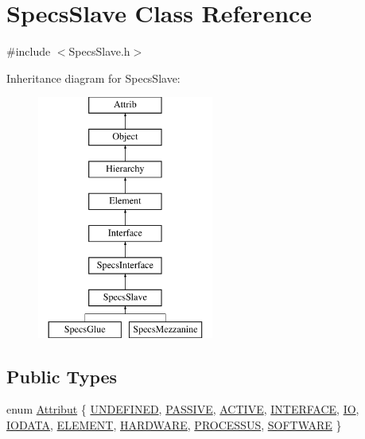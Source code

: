 \hypertarget{classSpecsSlave}{}\section{Specs\+Slave Class Reference}
\label{classSpecsSlave}


{\ttfamily \#include $<$Specs\+Slave.\+h$>$}

Inheritance diagram for Specs\+Slave\+:\begin{figure}[H]
\begin{center}
\leavevmode
\includegraphics[height=8.000000cm]{classSpecsSlave}
\end{center}
\end{figure}
\subsection*{Public Types}
\begin{DoxyCompactItemize}
\item 
enum \hyperlink{classAttrib_a69e171d7cc6417835a5a306d3c764235}{Attribut} \{ \newline
\hyperlink{classAttrib_a69e171d7cc6417835a5a306d3c764235a3a8da2ab97dda18aebab196fe4100531}{U\+N\+D\+E\+F\+I\+N\+ED}, 
\hyperlink{classAttrib_a69e171d7cc6417835a5a306d3c764235a2bfb2af57b87031d190a05fe25dd92ed}{P\+A\+S\+S\+I\+VE}, 
\hyperlink{classAttrib_a69e171d7cc6417835a5a306d3c764235a3b1fec929c0370d1436f2f06e298fb0d}{A\+C\+T\+I\+VE}, 
\hyperlink{classAttrib_a69e171d7cc6417835a5a306d3c764235aa27c16b480a369ea4d18b07b2516bbc7}{I\+N\+T\+E\+R\+F\+A\+CE}, 
\newline
\hyperlink{classAttrib_a69e171d7cc6417835a5a306d3c764235a1420a5b8c0540b2af210b6975eded7f9}{IO}, 
\hyperlink{classAttrib_a69e171d7cc6417835a5a306d3c764235a0af3b0d0ac323c1704e6c69cf90add28}{I\+O\+D\+A\+TA}, 
\hyperlink{classAttrib_a69e171d7cc6417835a5a306d3c764235a7788bc5dd333fd8ce18562b269c9dab1}{E\+L\+E\+M\+E\+NT}, 
\hyperlink{classAttrib_a69e171d7cc6417835a5a306d3c764235a61ceb22149f365f1780d18f9d1459423}{H\+A\+R\+D\+W\+A\+RE}, 
\newline
\hyperlink{classAttrib_a69e171d7cc6417835a5a306d3c764235a75250e29692496e73effca2c0330977f}{P\+R\+O\+C\+E\+S\+S\+US}, 
\hyperlink{classAttrib_a69e171d7cc6417835a5a306d3c764235a103a67cd0b8f07ef478fa45d4356e27b}{S\+O\+F\+T\+W\+A\+RE}
 \}
\end{DoxyCompactItemize}
